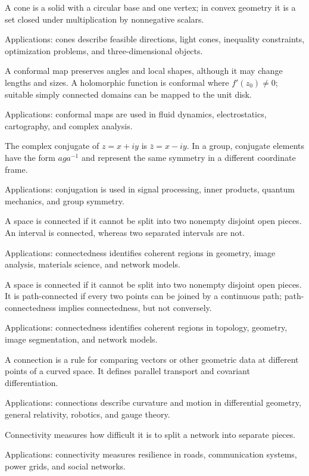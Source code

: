 A cone is a solid with a circular base and one vertex; in convex geometry it is a set closed under multiplication by nonnegative scalars. \par\noindent Applications: cones describe feasible directions, light cones, inequality constraints, optimization problems, and three-dimensional objects.

A conformal map preserves angles and local shapes, although it may change lengths and sizes. A holomorphic function is conformal where $f'(z_0)\ne0$; suitable simply connected domains can be mapped to the unit disk. \par\noindent Applications: conformal maps are used in fluid dynamics, electrostatics, cartography, and complex analysis.

The complex conjugate of $z=x+iy$ is $\bar z=x-iy$. In a group, conjugate elements have the form $aga^{-1}$ and represent the same symmetry in a different coordinate frame. \par\noindent Applications: conjugation is used in signal processing, inner products, quantum mechanics, and group symmetry.

A space is connected if it cannot be split into two nonempty disjoint open pieces. An interval is connected, whereas two separated intervals are not. \par\noindent Applications: connectedness identifies coherent regions in geometry, image analysis, materials science, and network models.

A space is connected if it cannot be split into two nonempty disjoint open pieces. It is path-connected if every two points can be joined by a continuous path; path-connectedness implies connectedness, but not conversely. \par\noindent Applications: connectedness identifies coherent regions in topology, geometry, image segmentation, and network models.

A connection is a rule for comparing vectors or other geometric data at different points of a curved space. It defines parallel transport and covariant differentiation. \par\noindent Applications: connections describe curvature and motion in differential geometry, general relativity, robotics, and gauge theory.

Connectivity measures how difficult it is to split a network into separate pieces.  \par\noindent Applications: connectivity measures resilience in roads, communication systems, power grids, and social networks.

